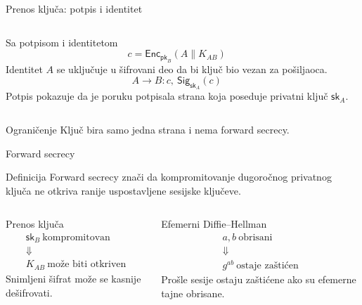 \documentclass[aspectratio=1610]{beamer}
\newcommand{\sig}[2]{\mathsf{Sig}_{#1}(#2)}
\newcommand{\Enc}[2]{\mathsf{Enc}_{#1}(#2)}
\newcommand{\pk}{\mathsf{pk}}
\newcommand{\sk}{\mathsf{sk}}
\begin{document}
\begin{frame}[t]{Prenos ključa: potpis i identitet}
\small
\begin{columns}[T,onlytextwidth]
\begin{block}{Sa potpisom i identitetom}
\[
c = \Enc{\pk_B}{A\parallel K_{AB}}
\]
Identitet $A$ se uključuje u šifrovani deo da bi ključ bio vezan za pošiljaoca.
\[
A \rightarrow B : c,\ \sig{\sk_A}{c}
\]
Potpis pokazuje da je poruku potpisala strana koja poseduje privatni ključ $\sk_A$.
\end{block}


\end{columns}

\vspace{0.3em}
\begin{alertblock}{Ograničenje}
Ključ bira samo jedna strana i nema forward secrecy.
\end{alertblock}
\end{frame}

\begin{frame}[t]{Forward secrecy}
\small
\begin{block}{Definicija}
Forward secrecy znači da kompromitovanje dugoročnog privatnog ključa ne otkriva ranije uspostavljene sesijske ključeve.
\end{block}

\begin{columns}[T,onlytextwidth]
\begin{alertblock}{Prenos ključa}
\centering
\[
\begin{array}{c}
\sk_B\ \text{kompromitovan} \\
\Downarrow \\
K_{AB}\ \text{može biti otkriven}
\end{array}
\]
\smallskip
\small Snimljeni šifrat može se kasnije dešifrovati.
\end{alertblock}

\begin{block}{Efemerni Diffie--Hellman}
\centering
\[
\begin{array}{c}
a,b\ \text{obrisani} \\
\Downarrow \\
g^{ab}\ \text{ostaje zaštićen}
\end{array}
\]
\smallskip
\small Prošle sesije ostaju zaštićene ako su efemerne tajne obrisane.
\end{block}
\end{columns}
\end{frame}
\end{document}
